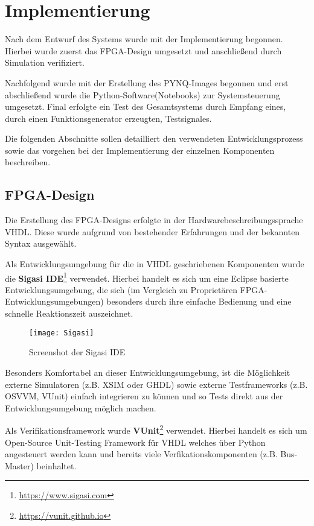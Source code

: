 \chapter{Implementierung}
Nach dem Entwurf des Systems wurde mit der Implementierung begonnen.
Hierbei wurde zuerst das \acs{FPGA}-Design umgesetzt und anschließend durch Simulation verifiziert.

Nachfolgend wurde mit der Erstellung des \acs{PYNQ}-Images begonnen und erst abschließend wurde die Python-Software(Notebooks) zur Systemsteuerung umgesetzt.
Final erfolgte ein Test des Gesamtsystems durch Empfang eines, durch einen Funktionsgenerator erzeugten, Testsignales.

Die folgenden Abschnitte sollen detailliert den verwendeten Entwicklungsprozess sowie das vorgehen bei der Implementierung der einzelnen Komponenten beschreiben.

\clearpage
\section{FPGA-Design} \label{Chap:Impl}
Die Erstellung des \acs{FPGA}-Designs erfolgte in der Hardwarebeschreibungssprache \acs{VHDL}. Diese wurde aufgrund von bestehender Erfahrungen und der bekannten Syntax ausgewählt.

Als Entwicklungsumgebung für die in \acs{VHDL} geschriebenen Komponenten wurde die \textbf{Sigasi IDE}\footnote{\href{https://www.sigasi.com}{https://www.sigasi.com}} verwendet.
Hierbei handelt es sich um eine Eclipse basierte Entwicklungsumgebung, die sich (im Vergleich zu Proprietären \acs{FPGA}-Entwicklungsumgebungen) besonders durch ihre einfache Bedienung und eine schnelle Reaktionszeit auszeichnet.
\begin{figure}[h]
	\centering
	\texttt{[image: Sigasi]}
	\caption{Screenshot der Sigasi IDE}
\end{figure}

Besonders Komfortabel an dieser Entwicklungsumgebung, ist die Möglichkeit externe Simulatoren (z.B. XSIM oder GHDL) sowie externe Testframeworks (z.B. OSVVM, VUnit) 
einfach integrieren zu können und so Tests direkt aus der Entwicklungsumgebung möglich machen.

Als Verifikationsframework wurde \textbf{VUnit}\footnote{\href{https://vunit.github.io}{https://vunit.github.io}} verwendet.
Hierbei handelt es sich um Open-Source Unit-Testing Framework für VHDL welches über Python angesteuert werden kann und bereits viele Verfikationskomponenten (z.B. Bus-Master) beinhaltet.

